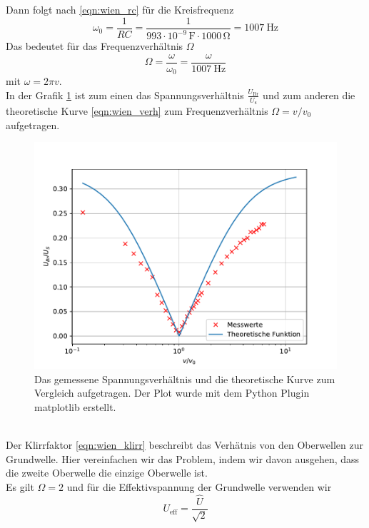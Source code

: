 Dann folgt nach \eqref{eqn:wien_rc} für die Kreisfrequenz
\begin{equation*}
  \omega_0 = \frac{1}{RC} = \frac{1}{993 \cdot 10^{-9}\, \si{\farad} \cdot 1000\, \si{\ohm}} = \SI{1007}{\hertz} 
\end{equation*}
Das bedeutet für das Frequenzverhältnis $\Omega$
\begin{equation*}
  \Omega = \frac{\omega}{\omega_0} = \frac{\omega}{\SI{1007}{\hertz}}
\end{equation*}
mit $\omega=2\pi v$.\\
In der Grafik \ref{fig:plot} ist zum einen das Spannungsverhältnis $\frac{U_\text{Br}}{U_\text{s}}$
und zum anderen die theoretische Kurve \eqref{eqn:wien_verh} zum Frequenzverhältnis $\Omega = v/v_0$ aufgetragen.
\begin{figure}
  \centering
  \includegraphics[width=\textwidth]{content/plot_e.pdf}
  \caption{Das gemessene Spannungsverhältnis und die theoretische Kurve zum Vergleich aufgetragen. Der Plot wurde mit dem Python Plugin matplotlib \cite{matplotlib} erstellt.}
  \label{fig:plot}
\end{figure}
\\
Der Klirrfaktor \eqref{eqn:wien_klirr} beschreibt das Verhätnis von den
Oberwellen zur Grundwelle. Hier vereinfachen wir das Problem, indem wir davon ausgehen, dass
die zweite Oberwelle die einzige Oberwelle ist.\\
Es gilt $\Omega = 2$ und für die Effektivspannung der Grundwelle verwenden wir
\begin{equation*}
  U_\text{eff} = \frac{\hat{U}}{\sqrt{2}}
\end{equation*}
